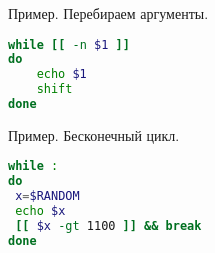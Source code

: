 \begin{frame}[fragile]
\frametitle{}

\begin{block}{Пример. Перебираем аргументы.}
\begin{lstlisting}[language=sh,frame=single]
while [[ -n $1 ]]
do
    echo $1
    shift
done
\end{lstlisting}
\end{block}


\begin{block}{Пример. Бесконечный цикл.}
\begin{lstlisting}[language=sh,frame=single]
while :
do
 x=$RANDOM
 echo $x
 [[ $x -gt 1100 ]] && break
done
\end{lstlisting}
\end{block}
\end{frame}
